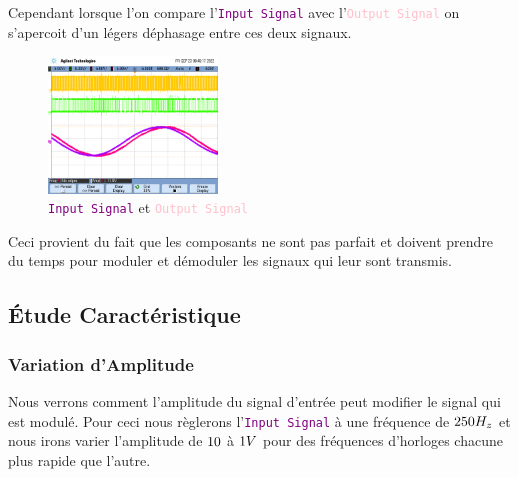 \documentclass[11pt, openright]{book}
\begin{document}
Cependant lorsque l'on compare l'\textcolor{purple}{\texttt{Input Signal}} avec l'\textcolor{pink}{\texttt{Output Signal}} on s'apercoit d'un légers déphasage entre ces deux signaux.

\begin{figure}[ht!]
    \centering
    \includegraphics[width=0.4\textwidth]{./object/g3.png}
    \caption{\textcolor{purple}{\texttt{Input Signal}} et \textcolor{pink}{\texttt{Output Signal}}}
\end{figure}

\newpage

Ceci provient du fait que les composants ne sont pas parfait et doivent prendre du temps pour moduler et démoduler les signaux qui leur sont transmis.

\subsection{Étude Caractéristique}
\vspace{-2cm}
\subsubsection{Variation d'Amplitude}
\vspace{-1cm}

Nous verrons comment l'amplitude du signal d'entrée peut modifier le signal qui est modulé. Pour ceci nous règlerons l'\textcolor{purple}{\texttt{Input Signal}} à une fréquence de $\color{black} 250H_z$ et nous irons varier l'amplitude de $\color{black} 10$ à $\color{black} 1V$ pour des fréquences d'horloges chacune plus rapide que l'autre.
\end{document}

